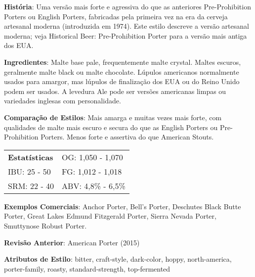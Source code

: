 \textbf{História}: Uma versão mais forte e agressiva do que as anteriores Pre-Prohibition Porters ou English Porters, fabricadas pela primeira vez na era da cerveja artesanal moderna (introduzida em 1974). Este estilo descreve a versão artesanal moderna; veja Historical Beer: Pre-Prohibition Porter para a versão mais antiga dos EUA.

\textbf{Ingredientes}: Malte base pale, frequentemente malte crystal. Maltes escuros, geralmente malte black ou malte chocolate. Lúpulos americanos normalmente usados para amargor, mas lúpulos de finalização dos EUA ou do Reino Unido podem ser usados. A levedura Ale pode ser versões americanas limpas ou variedades inglesas com personalidade.

\textbf{Comparação de Estilos}: Mais amarga e muitas vezes mais forte, com qualidades de malte mais escuro e secura do que as English Porters ou Pre-Prohibition Porters. Menos forte e assertiva do que American Stouts.

\begin{tabular}{@{}p{35mm}p{35mm}@{}}
  \textbf{Estatísticas} & OG: 1,050 - 1,070 \\
  IBU: 25 - 50  & FG: 1,012 - 1,018 \\
  SRM: 22 - 40  & ABV: 4,8\% - 6,5\%
\end{tabular}

\textbf{Exemplos Comerciais}: Anchor Porter, Bell’s Porter, Deschutes Black Butte Porter, Great Lakes Edmund Fitzgerald Porter, Sierra Nevada Porter, Smuttynose Robust Porter.

\textbf{Revisão Anterior}: American Porter (2015)

\textbf{Atributos de Estilo}: bitter, craft-style, dark-color, hoppy, north-america, porter-family, roasty, standard-strength, top-fermented
